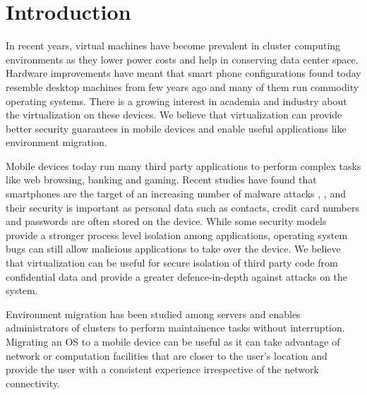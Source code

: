 \section{Introduction}
In recent years, virtual machines have become prevalent in cluster computing environments \cite{gartner2009virtual} as they lower power costs and help in conserving data center space. Hardware improvements have meant that smart phone configurations found today resemble desktop machines from few years ago and many of them run commodity operating systems. There is a growing interest in academia \cite{cox2007pocket} and industry \cite{vmware2009nextfrontier} about the virtualization on these devices. We believe that virtualization can provide better security guarantees in mobile devices and enable useful applications like environment migration.

Mobile devices today run many third party applications to perform complex tasks like web browsing, banking and gaming. Recent studies have found that smartphones are the target of an increasing number of malware attacks \cite{bose2006mobile},  \cite{cybercriminals2007banks},  \cite{iphone2010seriot} and their security is important as personal data such as contacts, credit card numbers and passwords are often stored on the device. While some security models \cite{androidsecurity} provide a stronger process level isolation among applications, operating system bugs \cite{kernel2009vulnerability} can still allow malicious applications to take over the device. We believe that virtualization can be useful for secure isolation of third party code from confidential data and provide a greater defence-in-depth against attacks on the system.

Environment migration has been studied among servers \cite{clark2005live} and enables administrators of clusters to perform maintainence tasks without interruption. Migrating an OS to a mobile device can be useful as it can take advantage of network or computation facilities that are closer to the user's location and provide the user with a consistent experience irrespective of the network connectivity. 
